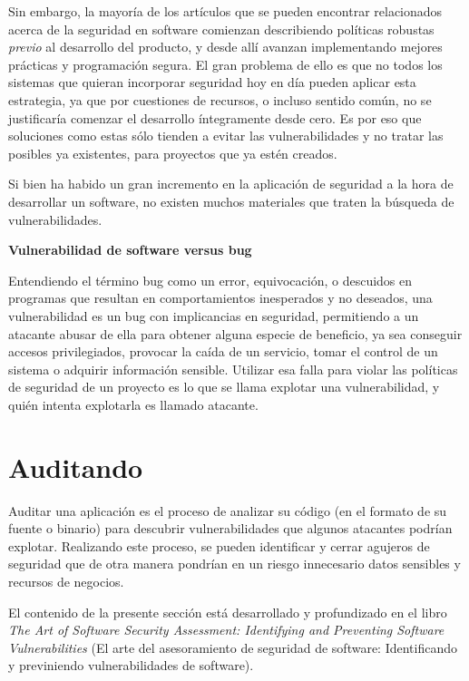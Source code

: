 Sin embargo, la mayoría de los artículos que se pueden encontrar relacionados acerca de la seguridad en software comienzan describiendo políticas robustas \textit{previo} al desarrollo del producto, y desde allí avanzan implementando mejores prácticas y programación segura. El gran problema de ello es que no todos los sistemas que quieran incorporar seguridad hoy en día pueden aplicar esta estrategia, ya que por cuestiones de recursos, o incluso sentido común, no se justificaría comenzar el desarrollo íntegramente desde cero. Es por eso que soluciones como estas sólo tienden a evitar las vulnerabilidades y no tratar las posibles ya existentes, para proyectos que ya estén creados.

Si bien ha habido un gran incremento en la aplicación de seguridad a la hora de desarrollar un software, no existen muchos materiales que traten la búsqueda de vulnerabilidades.

\begin{notesBox}
\textbf{Vulnerabilidad de software versus bug}

Entendiendo el término bug como un error, equivocación, o descuidos en programas que resultan en comportamientos inesperados y no deseados, una vulnerabilidad es un bug con implicancias en seguridad, permitiendo a un atacante abusar de ella para obtener alguna especie de beneficio, ya sea conseguir accesos privilegiados, provocar la caída de un servicio, tomar el control de un sistema o adquirir información sensible. Utilizar esa falla para violar las políticas de seguridad de un proyecto es lo que se llama explotar una vulnerabilidad, y quién intenta explotarla es llamado atacante.
\end{notesBox}

\section{Auditando}
Auditar una aplicación es el proceso de analizar su código (en el formato de su fuente o binario) para descubrir vulnerabilidades que algunos atacantes podrían explotar. Realizando este proceso, se pueden identificar y cerrar agujeros de seguridad que de otra manera pondrían en un riesgo innecesario datos sensibles y recursos de negocios.

El contenido de la presente sección está desarrollado y profundizado en el libro \textit{The Art of Software Security Assessment: Identifying and Preventing Software Vulnerabilities}\cite{Dowd:2006:ASS:1196394} (El arte del asesoramiento de seguridad de software: Identificando y previniendo vulnerabilidades de software).

